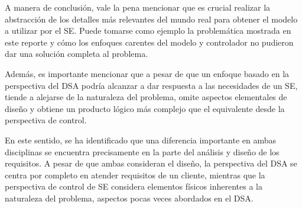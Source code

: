 \documentclass[journal]{IEEEtran}
\begin{document}
A manera de conclusión, vale la pena mencionar que es crucial realizar la abstracción de los detalles más relevantes del mundo real para obtener el modelo a utilizar por el SE. 
Puede tomarse como ejemplo la problemática mostrada en este reporte y cómo los enfoques carentes del modelo y controlador no pudieron dar una solución completa al problema.

Además, es importante mencionar que a pesar de que un enfoque basado en la perspectiva del DSA podría alcanzar a dar respuesta a las necesidades de un SE, tiende a alejarse de la naturaleza del problema, omite aspectos elementales de diseño y obtiene un producto lógico más complejo que el equivalente desde la perspectiva de control.

En este sentido, se ha identificado que una diferencia importante en ambas disciplinas se encuentra precisamente en la parte del análisis y diseño de los requisitos.
A pesar de que ambas consideran el diseño, la perspectiva del DSA se centra por completo en atender requisitos de un cliente, mientras que la perspectiva de control de SE considera elementos físicos inherentes a la naturaleza del problema, aspectos pocas veces abordados en el DSA.



\end{document}
